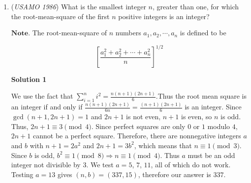 \begin{enumerate}
 Call the mathematicians A,B,C,D,E.  A starts out asleep.  B sleeps; A wakes; C sleeps; B wakes; D sleeps; C wakes; E sleeps; D wakes; A sleeps; E wakes; then, C sleeps; A wakes; E sleeps; C wakes; B sleeps; E wakes; D sleeps; B wakes; A sleeps; D wakes.  This creates, in order, the sleeping-pairs AB, BC, CD, DE, EA, then AC, CE, EB, BD, DA; each mathematician falls asleep and wakes up exactly twice, and at no time are three mathematicians asleep.

 Well, this must be considered a hole in the problem as written.  However, if we add the (nontrivial) assumption that the mathematicians were all awake when the lecture began, then it follows that the first occasion when a mathematician falls asleep can only account for zero sleeping-pairs, and the remaining 9 occasions can only account for 9 of 10 sleeping-pairs, and so there must be some pair of mathematicians that are not simultaneously asleep during the lecture.  So our assumption to the contrary implies an impossible sequence of events.  Therefore, that assumption must be wrong, and there must be a moment when three mathematicians are asleep.

 


	\item (\textit{USAMO 1986}) What is the smallest integer $n$, greater than one, for which the root-mean-square of the first $n$ positive integers is an integer?


 $\mathbf{Note.}$ The root-mean-square of $n$ numbers $a_1, a_2, \cdots, a_n$ is defined to be

 \[\left[\frac{a_1^2 + a_2^2 + \cdots + a_n^2}n\right]^{1/2}\]




\textbf{Solution 1}

We use the fact that $\sum_{i=1}^n i^2=\frac{n(n+1)(2n+1)}{6}$.Thus the root mean square is an integer if and only if $\frac{n(n+1)(2n+1)}{6n}=\frac{(n+1)(2n+1)}{6}$ is an integer. Since $\gcd(n+1,2n+1)=1$ and $2n+1$ is not even, $n+1$ is even, so $n$ is odd. Thus, $2n+1\equiv3\pmod4$. Since perfect squares are only $0$ or $1$ modulo $4$, $2n+1$ cannot be a perfect square. Therefore, there are nonnegative integers $a$ and $b$ with $n+1=2a^2$ and $2n+1=3b^2$, which means that $n\equiv1\pmod3$. Since $b$ is odd, $b^2\equiv1\pmod8\Rightarrow n\equiv1\pmod4$. Thus $a$ must be an odd integer not divisible by $3$. We test $a=5$, $7$, $11$, all of which do not work. Testing $a=13$ gives $(n,b)=(337,15)$, therefore our answer is $\boxed{337}$.


\end{enumerate}
